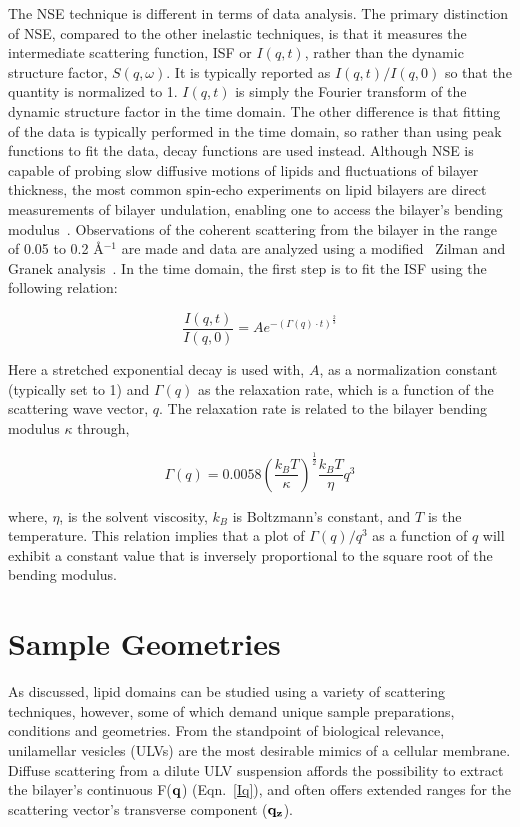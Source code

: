 \documentclass[8.5pt,twoside,twocolumn]{article}
\begin{document}
The NSE technique is different in terms of data analysis. The primary distinction of NSE, compared to the other inelastic techniques, is that it measures the intermediate scattering function, ISF or $I(q,t)$, rather than the dynamic structure factor, $S(q,\omega)$. It is typically reported as $I(q,t)/I(q,0)$ so that the quantity is normalized to 1. $I(q,t)$ is simply the Fourier transform of the dynamic structure factor in the time domain.  The other difference is that fitting of the data is typically performed in the time domain, so rather than using peak functions to fit the data, decay functions are used instead. Although NSE is capable of probing slow diffusive motions of lipids and fluctuations of bilayer thickness, the most common spin-echo experiments on lipid bilayers are direct measurements of bilayer undulation, enabling one to access the bilayer's bending modulus~\cite{Woodka.2012,Arriaga.2010,Pan.2015,Yi.2009,Lee.2010,Nickels.2015}. Observations of the coherent scattering from the bilayer in the range of 0.05 to 0.2 \AA$^{-1}$ are made and data are analyzed using a modified~\cite{Woodka.2012,Lee.2010,Watson.2010} Zilman and Granek analysis~\cite{Zilman.1996}. In the time domain, the first step is to fit the ISF using the following relation: 

\begin{equation}
\label{eq:Jon7}
\frac{I(q,t)}{I(q,0)} = A e^{-(\Gamma(q)\cdot t)^{\frac{2}{3}}}
\end{equation}

Here a stretched exponential decay is used with, $A$, as a normalization constant (typically set to 1) and $\Gamma(q)$ as the relaxation rate, which is a function of the scattering wave vector, $q$. The relaxation rate is related to the bilayer bending modulus $\kappa$ through, 

\begin{equation}
\label{eq:Jon8}
\Gamma(q) = 0.0058 \left( \frac{k_BT}{\kappa}\right)^{\frac{1}{2}} \frac{k_B T}{\eta}q^3
\end{equation}

where, $\eta$, is the solvent viscosity, $k_B$ is Boltzmann’s constant, and $T$ is the temperature. This relation implies that a plot of $\Gamma(q)/q^3$ as a function of $q$ will exhibit a constant value that is inversely proportional to the square root of the bending modulus. 

\section{Sample Geometries}
As discussed, lipid domains can be studied using a variety of scattering techniques, however, some of which demand unique sample preparations, conditions and geometries. From the standpoint of biological relevance, unilamellar vesicles (ULVs) are the most desirable mimics of a cellular membrane. Diffuse scattering from a dilute ULV suspension affords the possibility to extract the bilayer's continuous F($\bf{q}$) (Eqn.~\ref{Iq}), and often offers extended ranges for the scattering vector's transverse component ($\bf{q}_z$).
\end{document}
